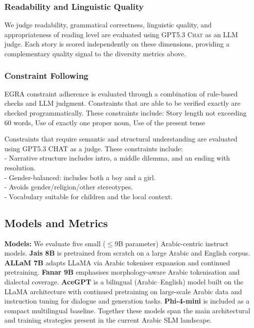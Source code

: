 \documentclass[11pt]{article}
\begin{document}
\subsubsection{Readability and Linguistic Quality}
\label{sec:llm-judge}

We judge readability, grammatical correctness, linguistic quality, and appropriateness of reading level are evaluated using \textsc{GPT5.3 Chat} \cite{openai2026gpt53instant} as an LLM judge. Each story is scored independently on these dimensions, providing a complementary
quality signal to the diversity metrics above.

\subsubsection{Constraint Following}
\label{sec:constraints}

EGRA constraint adherence is evaluated through a combination of rule-based checks and LLM judgment. Constraints that are able to be verified exactly are checked programmatically. These constraints include: Story length not exceeding 60 words, Use of exactly one proper noun, Use of the present tense

Constraints that require semantic and structural understanding are evaluated using \textsc{GPT5.3 CHAT} \cite{openai2026gpt53instant} as a judge. These constraints include:\\
- Narrative structure includes intro, a middle dilemma, and an ending with resolution.\\
- Gender-balanced: includes both a boy and a girl.\\
- Avoids gender/religion/other stereotypes.\\
- Vocabulary suitable for children and the local context.

\subsection{Models and Metrics}
\label{sec:models-metrics}

\textbf{Models: }We evaluate five small ($\leq$9B parameter) Arabic-centric instruct models. \textbf{Jais 8B} \cite{sengupta2023jais} is pretrained from scratch on a large Arabic and English corpus. \textbf{ALLaM 7B} \cite{bari2024allam} adapts LLaMA via Arabic tokeniser expansion and continued pretraining. \textbf{Fanar 9B} \cite{fanar2025} emphasises morphology-aware Arabic tokenisation and dialectal coverage. \textbf{AceGPT} \cite{huang2024acegpt} is a bilingual (Arabic--English) model built on the LLaMA architecture with continued pretraining on large-scale Arabic data and instruction tuning for dialogue and generation tasks. \textbf{Phi-4-mini} is included as a compact multilingual baseline. Together these models span the main architectural and training strategies present in the current Arabic SLM landscape.
\end{document}
